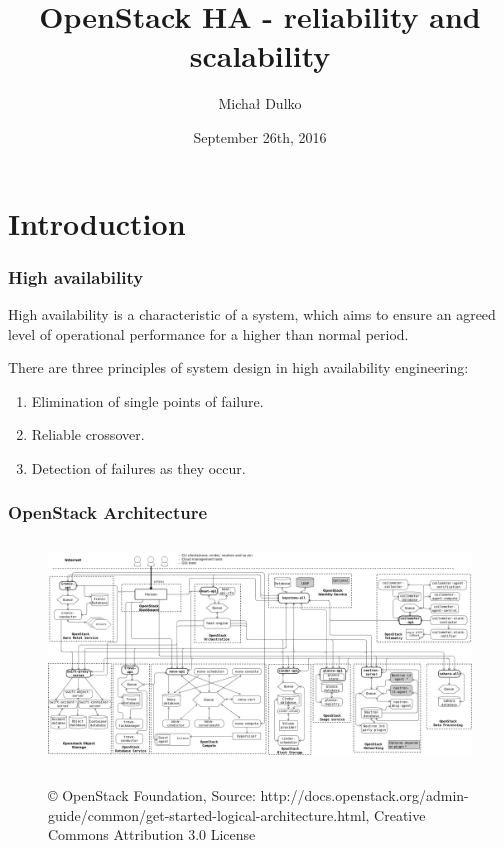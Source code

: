 \documentclass[aspectratio=169]{beamer}
\title{OpenStack HA - reliability and scalability}
\author{Michał Dulko}
\institute{Intel Technology Poland}
\date{September 26th, 2016}
\begin{document}

\begin{frame}
\titlepage
\end{frame}

\section{Introduction}

\begin{frame}
    \frametitle{High availability}
    High availability is a characteristic of a system, which aims to ensure an agreed level of operational performance for a higher than normal period.

    There are three principles of system design in high availability engineering:
    \begin{enumerate}
        \item Elimination of single points of failure.
        \item Reliable crossover.
        \item Detection of failures as they occur.
    \end{enumerate}
\end{frame}

\begin{frame}
    \frametitle{OpenStack Architecture}
    \begin{center}
        \begin{figure}
            \includegraphics[height=6cm]{images/openstack-arch-kilo-logical-v1.png}

            \tiny{© OpenStack Foundation, Source: http://docs.openstack.org/admin-guide/common/get-started-logical-architecture.html,  Creative Commons Attribution 3.0 License}
        \end{figure}
    \end{center}
\end{frame}
\end{document}
